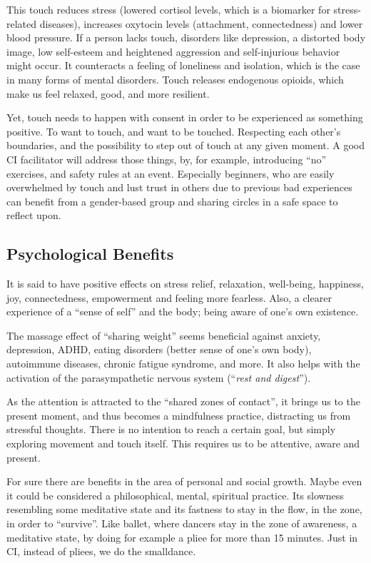 This touch reduces stress (lowered cortisol levels, which is a biomarker for stress-related diseases), increases oxytocin levels (attachment, connectedness) and lower blood pressure.
If a person lacks touch, disorders like depression, a distorted body image, low self-esteem and heightened aggression and self-injurious behavior might occur.
It counteracts a feeling of loneliness and isolation, which is the case in many forms of mental disorders.
Touch releases endogenous opioids, which make us feel relaxed, good, and more resilient.

Yet, touch needs to happen with consent in order to be experienced as something positive.
To want to touch, and want to be touched.
Respecting each other's boundaries, and the possibility to step out of touch at any given moment.
A good CI facilitator will address those things, by, for example, introducing ``no'' exercises, and safety rules at an event.
Especially beginners, who are easily overwhelmed by touch and lust trust in others due to previous bad experiences can benefit from a gender-based group and sharing circles in a safe space to reflect upon.

\subsection{Psychological Benefits}\label{subsec:psychological-health-benefits}

It is said to have positive effects on stress relief, relaxation, well-being, happiness, joy, connectedness, empowerment and feeling more fearless.
Also, a clearer experience of a ``sense of self'' and the body;
being aware of one's own existence.

The massage effect of ``sharing weight'' seems beneficial against anxiety, depression, ADHD, eating disorders (better sense of one's own body), autoimmune diseases, chronic fatigue syndrome, and more.
It also helps with the activation of the parasympathetic nervous system (``\textit{rest and digest}'').

As the attention is attracted to the ``shared zones of contact'', it brings us to the present moment, and thus becomes a mindfulness practice, distracting us from stressful thoughts.
There is no intention to reach a certain goal, but simply exploring movement and touch itself.
This requires us to be attentive, aware and present.

For sure there are benefits in the area of personal and social growth.
Maybe even it could be considered a philosophical, mental, spiritual practice.
Its slowness resembling some meditative state and its fastness to stay in the flow, in the zone, in order to ``survive''.
Like ballet, where dancers stay in the zone of awareness, a meditative state, by doing for example a pliee for more than 15 minutes.
Just in CI, instead of pliees, we do the \gls{smalldance}.

